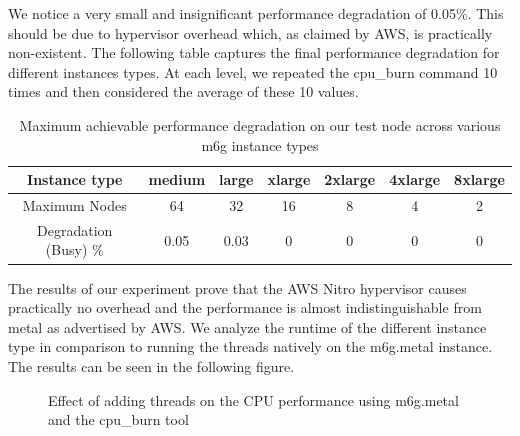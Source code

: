 \noindent
We notice a very small and insignificant performance  degradation of 0.05\%. This should be due 
to hypervisor overhead which, as claimed by AWS, is practically non-existent. 
The following table captures the final performance degradation for different instances types. 
At each level, we repeated the cpu\_burn command 10 times and then considered the average of these 10 values. 
\begin{table}[H]
\begin{center}
\begin{tabular}{ c|c|c|c|c|c|c }
 Instance type & medium & large & xlarge & 2xlarge & 4xlarge  & 8xlarge  \\
 \hline
 Maximum Nodes & 64 & 32 & 16 & 8 & 4 & 2 \\
\hline
Degradation (Busy) \%& 0.05 & 0.03 & 0 & 0 & 0 & 0  \\
\end{tabular}
\end{center}
\caption{Maximum achievable performance degradation on our test node across various m6g instance types}
\end{table}
\noindent
The results of our experiment prove that the AWS Nitro hypervisor causes practically no overhead and 
the performance is almost indistinguishable from metal as advertised by AWS. We analyze the runtime of 
the different instance type in comparison to running the threads natively on the m6g.metal instance. 
The results can be seen in the following figure. 
\begin{figure}[H]
\centering
{}
\caption{Effect of adding threads on the CPU performance using m6g.metal and the cpu\_burn tool}
\end{figure}
